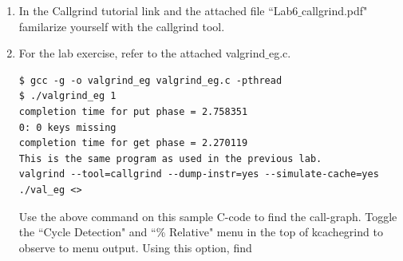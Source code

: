 \documentclass{sem5}
\author{Hemant Kumar}
\begin{document}
\begin{enumerate}
\item In the Callgrind tutorial link and the attached file ``Lab6$\_$callgrind.pdf" familarize yourself with the callgrind tool.
\item For the lab exercise, refer to the attached valgrind$\_$eg.c.
\begin{lstlisting}
$ gcc -g -o valgrind_eg valgrind_eg.c -pthread
$ ./valgrind_eg 1
completion time for put phase = 2.758351
0: 0 keys missing
completion time for get phase = 2.270119
This is the same program as used in the previous lab.
valgrind --tool=callgrind --dump-instr=yes --simulate-cache=yes ./val_eg <>
\end{lstlisting}

Use the above command on this sample C-code to find the call-graph. Toggle the ``Cycle Detection" and ``\% Relative" menu in the top of kcachegrind to observe to menu output. Using this option, find
\begin{itemize}


\end{itemize}
\end{enumerate}
\end{document}
